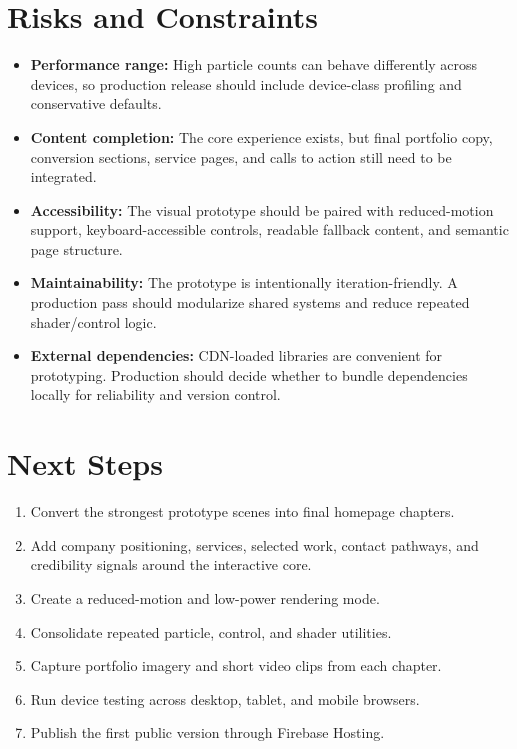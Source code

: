 \documentclass[11pt,a4paper]{article}
\newcommand{\sectionrule}{\vspace{0.2em}{\color{AirLine}\hrule height 0.8pt}\vspace{0.8em}}
\begin{document}
\section*{Risks and Constraints}
\sectionrule

\begin{itemize}
  \item \textbf{Performance range:} High particle counts can behave differently across devices, so production release should include device-class profiling and conservative defaults.
  \item \textbf{Content completion:} The core experience exists, but final portfolio copy, conversion sections, service pages, and calls to action still need to be integrated.
  \item \textbf{Accessibility:} The visual prototype should be paired with reduced-motion support, keyboard-accessible controls, readable fallback content, and semantic page structure.
  \item \textbf{Maintainability:} The prototype is intentionally iteration-friendly. A production pass should modularize shared systems and reduce repeated shader/control logic.
  \item \textbf{External dependencies:} CDN-loaded libraries are convenient for prototyping. Production should decide whether to bundle dependencies locally for reliability and version control.
\end{itemize}

\section*{Next Steps}
\sectionrule

\begin{enumerate}
  \item Convert the strongest prototype scenes into final homepage chapters.
  \item Add company positioning, services, selected work, contact pathways, and credibility signals around the interactive core.
  \item Create a reduced-motion and low-power rendering mode.
  \item Consolidate repeated particle, control, and shader utilities.
  \item Capture portfolio imagery and short video clips from each chapter.
  \item Run device testing across desktop, tablet, and mobile browsers.
  \item Publish the first public version through Firebase Hosting.
\end{enumerate}
\end{document}
